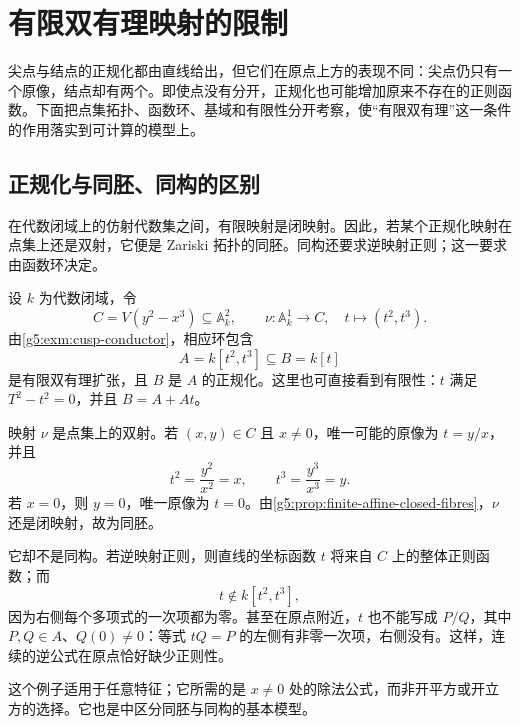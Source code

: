 
% 
% 
% 

\section{有限双有理映射的限制}
\label{g5:sec:0404}

尖点与结点的正规化都由直线给出，但它们在原点上方的表现不同：尖点仍只有一个原像，结点却有两个。即使点没有分开，正规化也可能增加原来不存在的正则函数。下面把点集拓扑、函数环、基域和有限性分开考察，使“有限双有理”这一条件的作用落实到可计算的模型上。

\subsection{正规化与同胚、同构的区别}
\label{g5:subsec:0404:01}

在代数闭域上的仿射代数集之间，有限映射是闭映射。因此，若某个正规化映射在点集上还是双射，它便是 Zariski 拓扑的同胚。同构还要求逆映射正则；这一要求由函数环决定。

\begin{example}
\label{g5:exm:cusp-homeomorphism}
	设 \(k\) 为代数闭域，令
	\[
		C=V(y^2-x^3)\subseteq\mathbb A_k^2,\qquad
		\nu:\mathbb A_k^1\longrightarrow C,\quad t\longmapsto(t^2,t^3).
	\]
	由\cref{g5:exm:cusp-conductor}，相应环包含
	\[
		A=k[t^2,t^3]\subseteq B=k[t]
	\]
	是有限双有理扩张，且 \(B\) 是 \(A\) 的正规化。这里也可直接看到有限性：\(t\) 满足 \(T^2-t^2=0\)，并且 \(B=A+At\)。

	映射 \(\nu\) 是点集上的双射。若 \((x,y)\in C\) 且 \(x\ne0\)，唯一可能的原像为 \(t=y/x\)，并且
	\[
		t^2=\frac{y^2}{x^2}=x,\qquad
		t^3=\frac{y^3}{x^3}=y.
	\]
	若 \(x=0\)，则 \(y=0\)，唯一原像为 \(t=0\)。由\cref{g5:prop:finite-affine-closed-fibres}，\(\nu\) 还是闭映射，故为同胚。

	它却不是同构。若逆映射正则，则直线的坐标函数 \(t\) 将来自 \(C\) 上的整体正则函数；而
	\[
		t\notin k[t^2,t^3],
	\]
	因为右侧每个多项式的一次项都为零。甚至在原点附近，\(t\) 也不能写成 \(P/Q\)，其中 \(P,Q\in A\)、\(Q(0)\ne0\)：等式 \(tQ=P\) 的左侧有非零一次项，右侧没有。这样，连续的逆公式在原点恰好缺少正则性。
\end{example}

这个例子适用于任意特征；它所需的是 \(x\ne0\) 处的除法公式，而非开平方或开立方的选择。它也是\cite[第I章，第3节，习题3.2(a)，第21页]{Hartshorne1977}中区分同胚与同构的基本模型。

